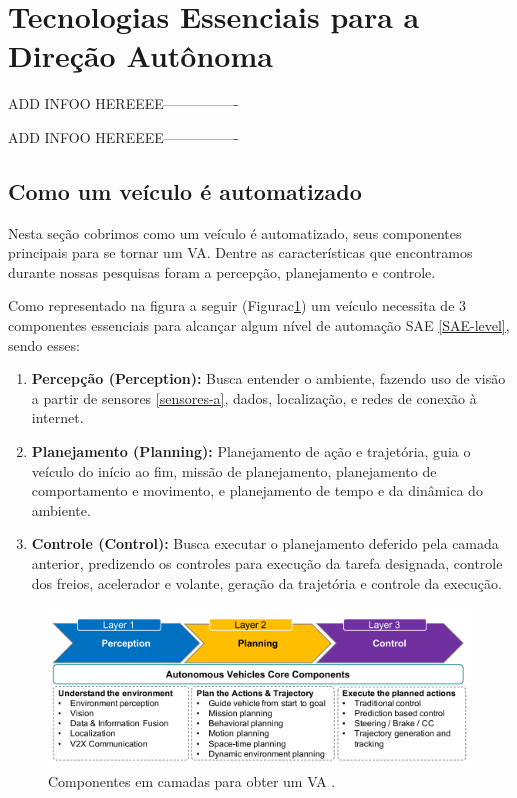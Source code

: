 \section{Tecnologias Essenciais para a Direção Autônoma}

ADD INFOO HEREEEE----------------

ADD INFOO HEREEEE----------------


\subsection{Como um veículo é automatizado}
Nesta seção cobrimos como um veículo é automatizado, seus componentes principais para se tornar um VA. Dentre as características que encontramos durante nossas pesquisas foram a percepção, planejamento e controle.

Como representado na figura a seguir (Figurac\ref{figura_perception}) um veículo necessita de 3 componentes essenciais para alcançar algum nível de automação SAE \ref{SAE-level}, sendo esses:


\begin{enumerate}
 \item \textbf{Percepção (Perception):} Busca entender o ambiente, fazendo uso de visão a partir de sensores \ref{sensores-a}, dados, localização, e redes de conexão à internet.
\item \textbf{Planejamento (Planning):} Planejamento de ação e trajetória, guia o veículo do início ao fim, missão de planejamento, planejamento de comportamento e movimento, e planejamento de tempo e da dinâmica do ambiente.
\item \textbf{Controle (Control):} Busca executar o planejamento deferido pela camada anterior, predizendo os controles para execução da tarefa designada, controle dos freios, acelerador e volante, geração da trajetória e controle da execução.

\end{enumerate}

\begin{figure}[H]
\centering
\includegraphics[width=\textwidth]{Figures/perception.png}
\caption{Componentes em camadas para obter um VA \cite{sensors-yet}.}
\label{figura_perception}
\end{figure}

